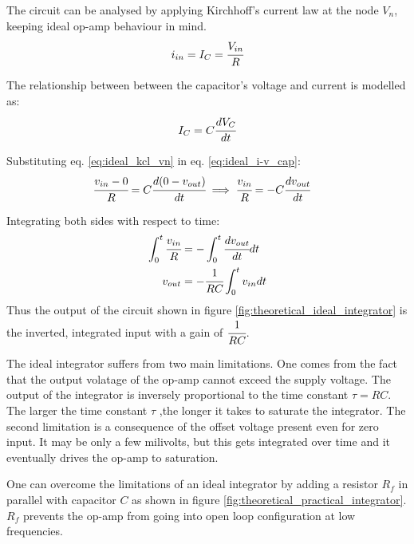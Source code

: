 \documentclass[12pt, titlepage]{article}
\theoremstyle{definition}
\begin{document}
    The circuit can be analysed by applying Kirchhoff's current law at the node $V_n$, keeping ideal op-amp behaviour in mind.
    \begin{equation}\label{eq:ideal_kcl_vn}
      i_{in} = I_C = \cfrac{V_{in}}{R}
    \end{equation}

    The relationship between between the capacitor's voltage and current is modelled as:
    \begin{equation}\label{eq:ideal_i-v_cap}
      I_C = C\cfrac{dV_C}{dt}
    \end{equation}

    Substituting eq. \ref{eq:ideal_kcl_vn} in eq. \ref{eq:ideal_i-v_cap}:
    \begin{align*}
      \cfrac{v_{in} - 0}{R} &= C\cfrac{d(0 - v_{out})}{dt}
      \implies \cfrac{v_{in}}{R} = -C\cfrac{dv_{out}}{dt}
    \end{align*}

    Integrating both sides with respect to time:
    \begin{align*}
      \int_0^t {\cfrac{v_{in}}{R}} &= - \int_0^t {\cfrac{dv_{out}}{dt}dt} \\
      v_{out} &= -\cfrac{1}{RC} \int_0^t {v_{in}{dt}}
    \end{align*}
    Thus the output of the circuit shown in figure \ref{fig:theoretical_ideal_integrator} is the inverted, integrated input with a gain of $\cfrac{1}{RC}$.

    The ideal integrator suffers from two main limitations. One comes from the fact that the output volatage of the op-amp cannot exceed the supply voltage.
    The output of the integrator is inversely proportional to the time constant $\tau = RC$.
    The larger the time constant $\tau$ ,the longer it takes to saturate the integrator.
    The second limitation is a consequence of the offset voltage present even for zero input.
    It may be only a few milivolts, but this gets integrated over time and it eventually drives the op-amp to saturation.

    One can overcome the limitations of an ideal integrator by adding a resistor $R_{f}$ in parallel with capacitor $C$ as shown in figure \ref{fig:theoretical_practical_integrator}. $R_{f}$ prevents the op-amp from going into open loop configuration at low frequencies.
\end{document}
